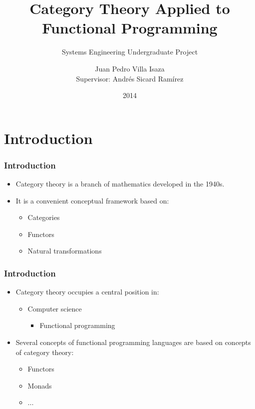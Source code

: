 \documentclass{beamer}
\title{Category Theory Applied to Functional Programming}
\subtitle{Systems Engineering Undergraduate Project}
\author[Juan Pedro Villa Isaza]{Juan Pedro Villa Isaza\\
  Supervisor: Andrés Sicard Ramírez}
\institute{EAFIT University}
\date{2014}
\begin{document}
\frame{\titlepage}



\section{Introduction}


\begin{frame}[label={introduction}]
  \frametitle{Introduction}

  \begin{itemize}
  \item
    Category theory is a branch of mathematics developed in the 1940s.
  \item
    It is a convenient conceptual framework based on:
    \begin{itemize}
    \item
      Categories
    \item
      Functors
    \item
      Natural transformations
    \end{itemize}
  \end{itemize}

\end{frame}


\begin{frame}
  \frametitle{Introduction}

  \begin{itemize}
  \item
    Category theory occupies a central position in:
    \begin{itemize}
    \item
      Computer science
      \begin{itemize}
      \item
        Functional programming
      \end{itemize}
    \end{itemize}
  \item
    Several concepts of functional programming languages are based on
    concepts of category theory:
    \begin{itemize}
    \item
      Functors
    \item
      Monads
    \item
      ...
    \end{itemize}
  \end{itemize}

\end{frame}
\end{document}
